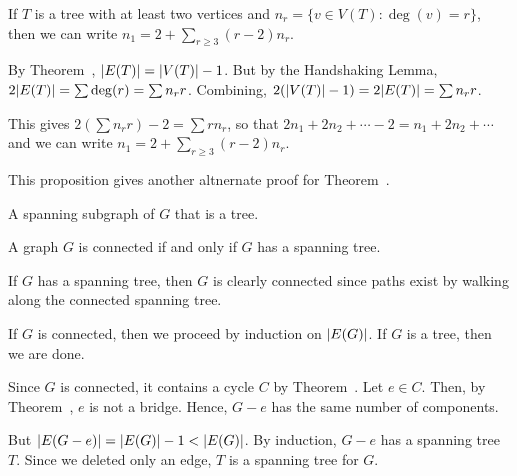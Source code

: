 \documentclass[class=math239,notes,tikz]{agony}
\begin{document}
\begin{prop}
  If $T$ is a tree with at least two vertices
  and $n_r = \{ v \in V(T) : \deg(v) = r \}$, then we can write
  $n_1 = 2 + \sum_{r \geq 3} (r-2) n_r$.
\end{prop}
\begin{prf}
  By Theorem~, $\abs{E(T)} = \abs{V(T)} - 1$.
  But by the Handshaking Lemma, $2\abs{E(T)} = \sum \deg(r) = \sum n_r r$.
  Combining, $2(\abs{V(T)}-1) = 2\abs{E(T)} = \sum n_r r$.

  This gives $2(\sum n_r r) - 2 = \sum r n_r$,
  so that $2n_1 + 2n_2 + \dotsb - 2 = n_1 + 2n_2 + \dotsb$
  and we can write $n_1 = 2 + \sum_{r \geq 3}(r-2)n_r$.
\end{prf}

This proposition gives another altnernate proof for Theorem~.

\begin{defn}
  A spanning subgraph of $G$ that is a tree.
\end{defn}

\begin{theorem}[5.2.1]
  A graph $G$ is connected if and only if $G$ has a spanning tree.
\end{theorem}
\begin{prf}
  If $G$ has a spanning tree, then $G$ is clearly connected
  since paths exist by walking along the connected spanning tree.

  If $G$ is connected, then we proceed by induction on $\abs{E(G)}$.
  If $G$ is a tree, then we are done.

  Since $G$ is connected, it contains a cycle $C$ by Theorem~.
  Let $e \in C$.
  Then, by Theorem~, $e$ is not a bridge.
  Hence, $G-e$ has the same number of components.

  But $\abs{E(G-e)} = \abs{E(G)} - 1 < \abs{E(G)}$.
  By induction, $G-e$ has a spanning tree $T$.
  Since we deleted only an edge, $T$ is a spanning tree for $G$.
\end{prf}
\end{document}

